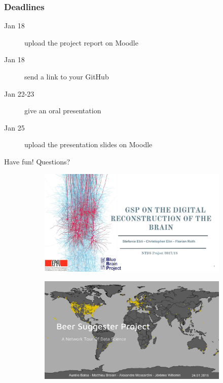 \documentclass[aspectratio=169]{beamer}
\begin{document}

\begin{frame}
	\frametitle{Deadlines}
	\begin{description}
		\item[Jan 18] upload the project report on Moodle
		\vfill
		\item[Jan 18] send a link to your GitHub
		\vfill
		\item[Jan 22-23] give an oral presentation
		\vfill
		\item[Jan 25] upload the presentation slides on Moodle
	\end{description}
\end{frame}


\begin{frame}
	\begin{center}
		\Huge Have fun!
		\hspace{2em}
		\Huge Questions?
	\end{center}
	\begin{figure}
		\centering
		\begin{subfigure}[b]{0.24\linewidth}
			\includegraphics[width=\linewidth]{project2017_brain}
		\end{subfigure}
		\hfill
		\begin{subfigure}[b]{0.24\linewidth}
			\includegraphics[width=\linewidth]{project2017_beer}

\end{subfigure}
\end{figure}
\end{frame}
\end{document}
